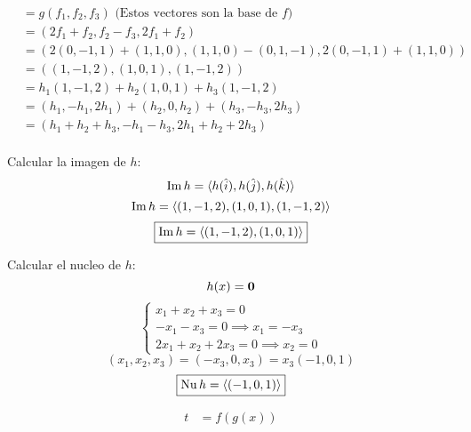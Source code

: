 \documentclass[../practica.root.tex]{subfiles}
\begin{document}
\begin{enumerate}
\begin{enumerate}
\begin{align*}
                          & = g( f_1,f_2,f_3 ) \text{ (Estos vectores son la base de $f$)}   \\
                          & = (2f_1 + f_2, f_2 - f_3,2f_1 + f_2)                             \\
                          & = (2(0,-1,1) + (1,1,0), (1,1,0) - (0,1,-1), 2(0,-1,1) + (1,1,0)) \\
                          & = ( (1,-1,2), (1,0,1), (1,-1,2) )                                \\
                          & = h_1(1,-1,2) + h_2(1,0,1) + h_3(1,-1,2)                         \\
                          & = (h_1,-h_1,2h_1) + (h_2,0,h_2) + (h_3,-h_3,2h_3)                \\
                          & = (h_1 + h_2 + h_3, -h_1 -h_3, 2h_1 + h_2 + 2h_3)                \\
                    \end{align*}
                    \begin{minipage}[t]{0.5\textwidth}
                        Calcular la imagen de $h$:
                        \[ \operatorname{Im} h = \langle h(\hat{i}),h(\hat{j}),h(\hat{k}) \rangle \]
                        \[ \operatorname{Im} h = \langle (1,-1,2),(1,0,1),(1,-1,2) \rangle \]
                        \[ \boxed{\operatorname{Im} h = \langle (1,-1,2),(1,0,1) \rangle} \]
                    \end{minipage}
                    \begin{minipage}[t]{0.5\textwidth}
                        Calcular el nucleo de $h$:
                        \[ h(x) = \mathbf{0} \]
                        \[
                            \begin{cases}
                                x_1 + x_2 + x_3 = 0               \\
                                -x_1 -x_3 = 0 \implies x_1 = -x_3 \\
                                2x_1 + x_2 + 2x_3 = 0 \implies x_2 = 0
                            \end{cases}
                        \] \[
                            (x_1, x_2, x_3) = (-x_3,0,x_3) = x_3(-1,0,1)
                        \] \[
                            \boxed{\operatorname{Nu} h = \langle (-1,0,1) \rangle}
                        \]
                    \end{minipage}
                    \begin{align*}
                        t & = f(g(x))                                                               \\

\end{align*}
\end{enumerate}
\end{enumerate}
\end{document}
